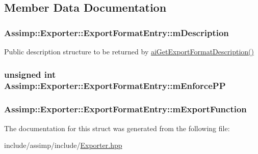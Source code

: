 \subsection{Member Data Documentation}
\hypertarget{struct_assimp_1_1_exporter_1_1_export_format_entry_a59f8bf48e35a70ac0540c9b65d4b891d}{
\subsubsection[{m\-Description}]{ Assimp\-::\-Exporter\-::\-Export\-Format\-Entry\-::m\-Description}}\label{struct_assimp_1_1_exporter_1_1_export_format_entry_a59f8bf48e35a70ac0540c9b65d4b891d}


Public description structure to be returned by \hyperlink{cexport_8h_adda7f2e6611f719af6c8a4a0bef0a0a2}{ai\-Get\-Export\-Format\-Description()} 

\hypertarget{struct_assimp_1_1_exporter_1_1_export_format_entry_aefb2d077aebc473ce9a6e38fd883f181}{
\subsubsection[{m\-Enforce\-P\-P}]{\setlength{\rightskip}{0pt plus 5cm}unsigned {\bf int} Assimp\-::\-Exporter\-::\-Export\-Format\-Entry\-::m\-Enforce\-P\-P}}\label{struct_assimp_1_1_exporter_1_1_export_format_entry_aefb2d077aebc473ce9a6e38fd883f181}
\hypertarget{struct_assimp_1_1_exporter_1_1_export_format_entry_a5cf4464ae6f7f7d92aaade27f1e545f5}{
\subsubsection[{m\-Export\-Function}]{ Assimp\-::\-Exporter\-::\-Export\-Format\-Entry\-::m\-Export\-Function}}\label{struct_assimp_1_1_exporter_1_1_export_format_entry_a5cf4464ae6f7f7d92aaade27f1e545f5}


The documentation for this struct was generated from the following file\-:\begin{DoxyCompactItemize}
\item 
include/assimp/include/\hyperlink{_exporter_8hpp}{Exporter.\-hpp}\end{DoxyCompactItemize}
